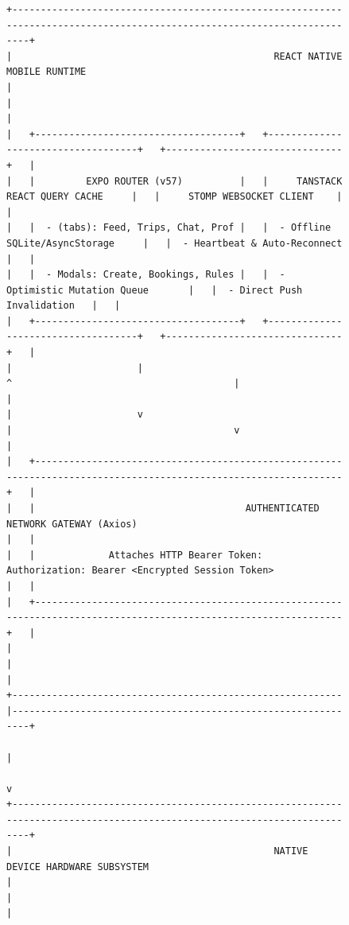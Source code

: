 \documentclass[conference,10pt,a4paper]{IEEEtran}
\begin{document}
\begin{figure}[!t]
\centering
\begin{lstlisting}[basicstyle=\ttfamily\fontsize{6pt}{7pt}\selectfont,frame=single,numbers=none]
+-------------------------------------------------------------------------------------------------------------------------+
|                                              REACT NATIVE MOBILE RUNTIME                                                |
|                                                                                                                         |
|   +------------------------------------+   +------------------------------------+   +-------------------------------+   |
|   |         EXPO ROUTER (v57)          |   |     TANSTACK REACT QUERY CACHE     |   |     STOMP WEBSOCKET CLIENT    |   |
|   |  - (tabs): Feed, Trips, Chat, Prof |   |  - Offline SQLite/AsyncStorage     |   |  - Heartbeat & Auto-Reconnect |   |
|   |  - Modals: Create, Bookings, Rules |   |  - Optimistic Mutation Queue       |   |  - Direct Push Invalidation   |   |
|   +------------------------------------+   +------------------------------------+   +-------------------------------+   |
|                      |                                       ^                                       |                  |
|                      v                                       |                                       v                  |
|   +-----------------------------------------------------------------------------------------------------------------+   |
|   |                                     AUTHENTICATED NETWORK GATEWAY (Axios)                                       |   |
|   |             Attaches HTTP Bearer Token: Authorization: Bearer <Encrypted Session Token>                         |   |
|   +-----------------------------------------------------------------------------------------------------------------+   |
|                                                          |                                                              |
+----------------------------------------------------------|--------------------------------------------------------------+
                                                           |
                                                           v
+-------------------------------------------------------------------------------------------------------------------------+
|                                              NATIVE DEVICE HARDWARE SUBSYSTEM                                           |
|                                                                                                                         |

\end{lstlisting}
\end{figure}
\end{document}
